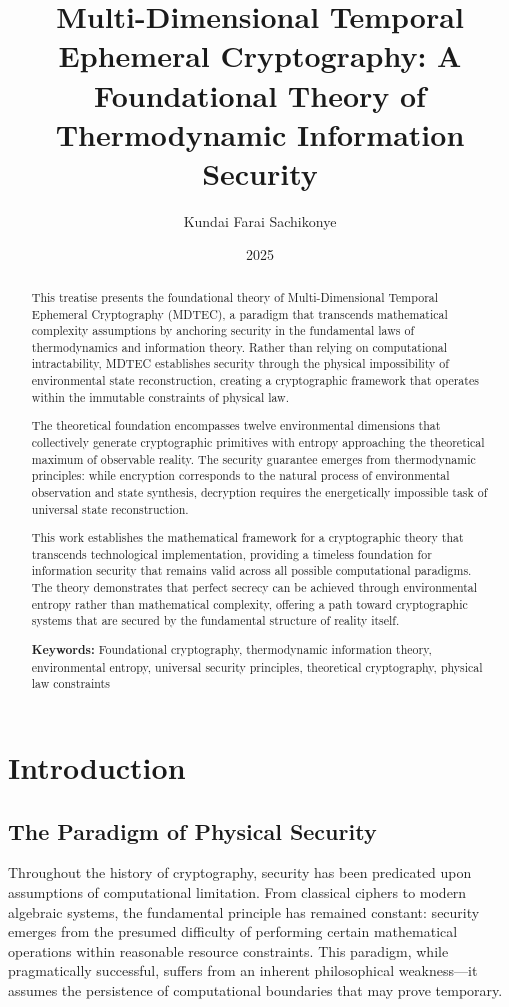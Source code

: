 \documentclass[12pt]{article}
\title{Multi-Dimensional Temporal Ephemeral Cryptography: A Foundational Theory of Thermodynamic Information Security}
\author{Kundai Farai Sachikonye}
\date{2025}
\begin{document}
\maketitle

\begin{abstract}
This treatise presents the foundational theory of Multi-Dimensional Temporal Ephemeral Cryptography (MDTEC), a paradigm that transcends mathematical complexity assumptions by anchoring security in the fundamental laws of thermodynamics and information theory. Rather than relying on computational intractability, MDTEC establishes security through the physical impossibility of environmental state reconstruction, creating a cryptographic framework that operates within the immutable constraints of physical law.

The theoretical foundation encompasses twelve environmental dimensions that collectively generate cryptographic primitives with entropy approaching the theoretical maximum of observable reality. The security guarantee emerges from thermodynamic principles: while encryption corresponds to the natural process of environmental observation and state synthesis, decryption requires the energetically impossible task of universal state reconstruction.

This work establishes the mathematical framework for a cryptographic theory that transcends technological implementation, providing a timeless foundation for information security that remains valid across all possible computational paradigms. The theory demonstrates that perfect secrecy can be achieved through environmental entropy rather than mathematical complexity, offering a path toward cryptographic systems that are secured by the fundamental structure of reality itself.

\textbf{Keywords:} Foundational cryptography, thermodynamic information theory, environmental entropy, universal security principles, theoretical cryptography, physical law constraints
\end{abstract}

\section{Introduction}

\subsection{The Paradigm of Physical Security}

Throughout the history of cryptography, security has been predicated upon assumptions of computational limitation. From classical ciphers to modern algebraic systems, the fundamental principle has remained constant: security emerges from the presumed difficulty of performing certain mathematical operations within reasonable resource constraints. This paradigm, while pragmatically successful, suffers from an inherent philosophical weakness—it assumes the persistence of computational boundaries that may prove temporary.
\end{document}
